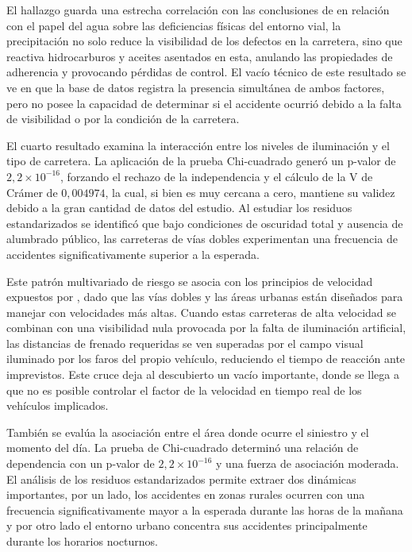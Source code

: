 \documentclass[12pt]{article}
\begin{document}
 El hallazgo guarda una estrecha correlación con las conclusiones de \textcite{KARZAN2017} en relación con el papel del agua sobre las deficiencias físicas del entorno vial, la precipitación no solo reduce la visibilidad de los defectos en la carretera, sino que reactiva hidrocarburos y aceites asentados en esta, anulando las propiedades de adherencia y provocando pérdidas de control. El vacío técnico de este resultado se ve en que la base de datos registra la presencia simultánea de ambos factores, pero no posee la capacidad de determinar si el accidente ocurrió debido a la falta de visibilidad o por la condición de la carretera.

 El cuarto resultado examina la interacción entre los niveles de iluminación y el tipo de carretera. La aplicación de la prueba Chi-cuadrado generó un p-valor de $2,2 \times 10^{-16}$, forzando el rechazo de la independencia y el cálculo de la V de Crámer de $0,004974$, la cual, si bien es muy cercana a cero, mantiene su validez debido a la gran cantidad de datos del estudio. Al estudiar los residuos estandarizados se identificó que bajo condiciones de oscuridad total y ausencia de alumbrado público, las carreteras de vías dobles experimentan una frecuencia de accidentes significativamente superior a la esperada.

 Este patrón multivariado de riesgo se asocia con los principios de velocidad expuestos por \textcite{TAYLOR2000}, dado que las vías dobles y las áreas urbanas están diseñados para manejar con velocidades más altas. Cuando estas carreteras de alta velocidad se combinan con una visibilidad nula provocada por la falta de iluminación artificial, las distancias de frenado requeridas se ven superadas por el campo visual iluminado por los faros del propio vehículo, reduciendo el tiempo de reacción ante imprevistos. Este cruce deja al descubierto un vacío importante, donde se llega a que no es posible controlar el factor de la velocidad en tiempo real de los vehículos implicados.

 También se evalúa la asociación entre el área donde ocurre el siniestro y el momento del día. La prueba de Chi-cuadrado determinó una relación de dependencia con un p-valor de $2,2 \times 10^{-16}$ y una fuerza de asociación moderada. El análisis de los residuos estandarizados permite extraer dos dinámicas importantes, por un lado, los accidentes en zonas rurales ocurren con una frecuencia significativamente mayor a la esperada durante las horas de la mañana y por otro lado el entorno urbano concentra sus accidentes principalmente durante los horarios nocturnos.
\end{document}
